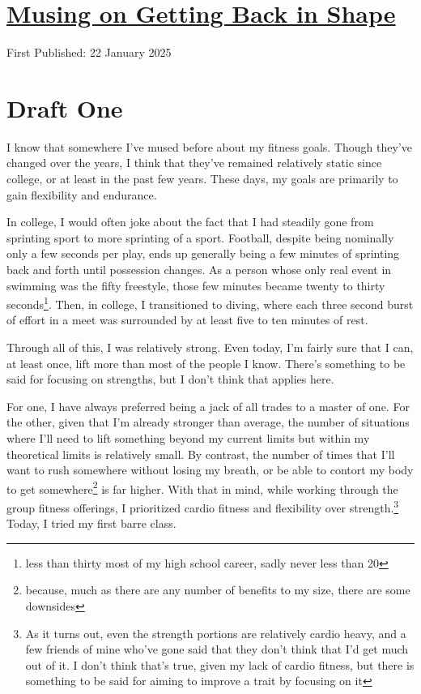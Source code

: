 \documentclass[12pt]{article}[titlepage]
\renewcommand{\,}{\textsuperscript{,}}
\begin{document}
\doublespacing
\section{\href{back-in-shape.html}{Musing on Getting Back in Shape}}

First Published: 22 January 2025

\section{Draft One}  
I know that somewhere I've mused before about my fitness goals.  
Though they've changed over the years, I think that they've remained relatively static since college, or at least in the past few years.  
These days, my goals are primarily to gain flexibility and endurance.

In college, I would often joke about the fact that I had steadily gone from sprinting sport to more sprinting of a sport.  
Football, despite being nominally only a few seconds per play, ends up generally being a few minutes of sprinting back and forth until possession changes.  
As a person whose only real event in swimming was the fifty freestyle, those few minutes became twenty to thirty seconds\footnote{less than thirty most of my high school career, sadly never less than 20}.  
Then, in college, I transitioned to diving, where each three second burst of effort in a meet was surrounded by at least five to ten minutes of rest.

Through all of this, I was relatively strong.  
Even today, I'm fairly sure that I can, at least once, lift more than most of the people I know.  
There's something to be said for focusing on strengths, but I don't think that applies here.

For one, I have always preferred being a jack of all trades to a master of one.  
For the other, given that I'm already stronger than average, the number of situations where I'll need to lift something beyond my current limits but within my theoretical limits is relatively small.  
By contrast, the number of times that I'll want to rush somewhere without losing my breath, or be able to contort my body to get somewhere\footnote{because, much as there are any number of benefits to my size, there are some downsides} is far higher.  
With that in mind, while working through the group fitness offerings, I prioritized cardio fitness and flexibility over strength.\footnote{As it turns out, even the strength portions are relatively cardio heavy, and a few friends of mine who've gone said that they don't think that I'd get much out of it. I don't think that's true, given my lack of cardio fitness, but there is something to be said for aiming to improve a trait by focusing on it}  
Today, I tried my first barre class.
\end{document}
